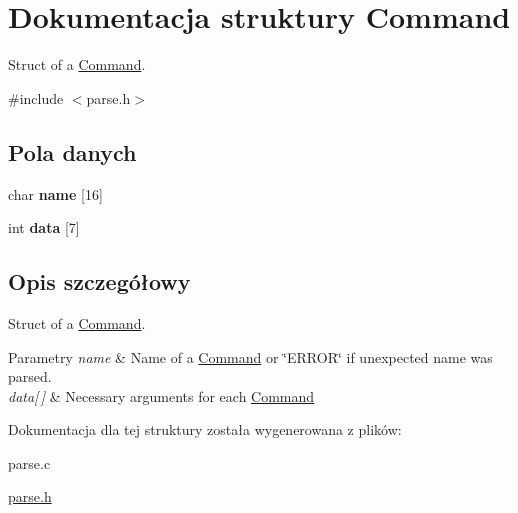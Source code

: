 \hypertarget{structCommand}{\section{Dokumentacja struktury Command}
\label{structCommand}
}


Struct of a \hyperlink{structCommand}{Command}.  




{\ttfamily \#include $<$parse.\-h$>$}

\subsection*{Pola danych}
\begin{DoxyCompactItemize}
\item 
\hypertarget{structCommand_af30a8e38eeb8d2828d9f13776d3d3604}{char {\bfseries name} \mbox{[}16\mbox{]}}\label{structCommand_af30a8e38eeb8d2828d9f13776d3d3604}

\item 
\hypertarget{structCommand_a8b948a8a596cd32e9b98c1bdb6bfe013}{int {\bfseries data} \mbox{[}7\mbox{]}}\label{structCommand_a8b948a8a596cd32e9b98c1bdb6bfe013}

\end{DoxyCompactItemize}


\subsection{Opis szczegółowy}
Struct of a \hyperlink{structCommand}{Command}. 


\begin{DoxyParams}{Parametry}
{\em name} & Name of a \hyperlink{structCommand}{Command} or \char`\"{}\-E\-R\-R\-O\-R\char`\"{} if unexpected name was parsed. \\
\hline
{\em data\mbox{[}$\,$\mbox{]}} & Necessary arguments for each \hyperlink{structCommand}{Command} \\
\hline
\end{DoxyParams}


Dokumentacja dla tej struktury została wygenerowana z plików\-:\begin{DoxyCompactItemize}
\item 
parse.\-c\item 
\hyperlink{parse_8h}{parse.\-h}\end{DoxyCompactItemize}

